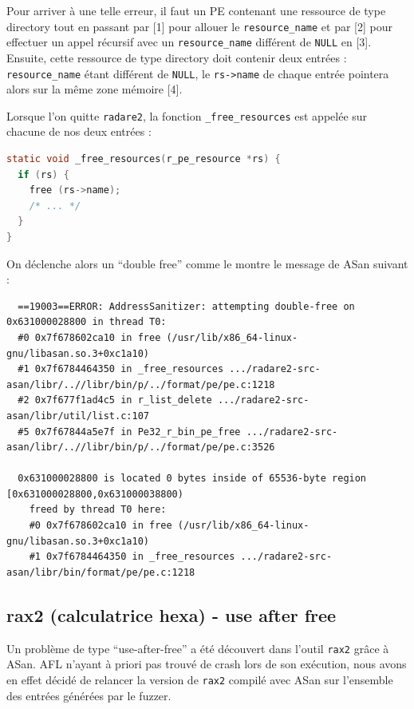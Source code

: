 Pour arriver à une telle erreur, il faut un PE contenant une ressource de type directory tout en passant par [1] pour allouer le \lstinline{resource_name} et par [2] pour effectuer un appel récursif avec un \lstinline{resource_name} différent de \lstinline{NULL} en [3].
Ensuite, cette ressource de type directory doit contenir deux entrées : \lstinline{resource_name} étant différent de \lstinline{NULL}, le \lstinline{rs->name} de chaque entrée pointera alors sur la même zone mémoire [4].

Lorsque l'on quitte \lstinline{radare2}, la fonction \lstinline{_free_resources} est appelée sur chacune de nos deux entrées :

\begin{lstlisting}[language=C]
static void _free_resources(r_pe_resource *rs) {
  if (rs) {
    free (rs->name);
    /* ... */
  }
}
\end{lstlisting}

On déclenche alors un ``double free'' comme le montre le message de ASan suivant :

\begin{lstlisting}
  ==19003==ERROR: AddressSanitizer: attempting double-free on 0x631000028800 in thread T0:
  #0 0x7f678602ca10 in free (/usr/lib/x86_64-linux-gnu/libasan.so.3+0xc1a10)
  #1 0x7f6784464350 in _free_resources .../radare2-src-asan/libr/..//libr/bin/p/../format/pe/pe.c:1218
  #2 0x7f677f1ad4c5 in r_list_delete .../radare2-src-asan/libr/util/list.c:107
  #5 0x7f67844a5e7f in Pe32_r_bin_pe_free .../radare2-src-asan/libr/..//libr/bin/p/../format/pe/pe.c:3526

  0x631000028800 is located 0 bytes inside of 65536-byte region [0x631000028800,0x631000038800)
    freed by thread T0 here:
    #0 0x7f678602ca10 in free (/usr/lib/x86_64-linux-gnu/libasan.so.3+0xc1a10)
    #1 0x7f6784464350 in _free_resources .../radare2-src-asan/libr/bin/format/pe/pe.c:1218
\end{lstlisting}


\subsection{rax2 (calculatrice hexa) - use after free}

Un problème de type ``use-after-free'' a été découvert dans l'outil \lstinline{rax2} grâce à ASan.
AFL n'ayant à priori pas trouvé de crash lors de son exécution, nous avons en effet décidé de relancer la version de \lstinline{rax2} compilé avec ASan sur l'ensemble des entrées générées par le fuzzer.

